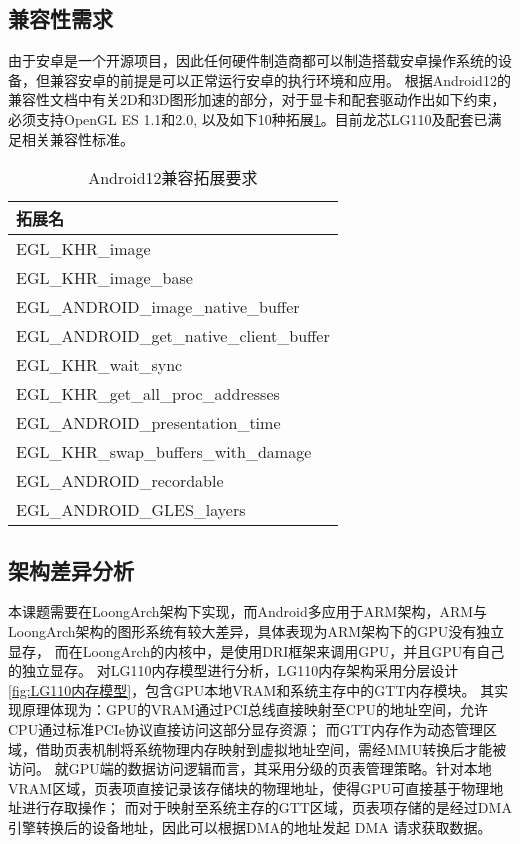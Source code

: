 \subsection{兼容性需求}
由于安卓是一个开源项目，因此任何硬件制造商都可以制造搭载安卓操作系统的设备，但兼容安卓的前提是可以正常运行安卓的执行环境和应用。
根据Android12的兼容性文档\cite{Android-12-cdd}中有关2D和3D图形加速的部分，对于显卡和配套驱动作出如下约束，必须支持OpenGL ES 1.1和2.0,
以及如下10种拓展\ref{tab:Android12兼容拓展要求}。目前龙芯LG110及配套已满足相关兼容性标准。

\begin{table}[h]
  \centering
  \caption{Android12兼容拓展要求}
  \label{tab:Android12兼容拓展要求}
  \begin{tabular}{l}
    \toprule
    拓展名  \\
    \midrule
    EGL\_KHR\_image \\
    EGL\_KHR\_image\_base \\
    EGL\_ANDROID\_image\_native\_buffer \\
    EGL\_ANDROID\_get\_native\_client\_buffer \\
    EGL\_KHR\_wait\_sync \\
    EGL\_KHR\_get\_all\_proc\_addresses \\
    EGL\_ANDROID\_presentation\_time \\
    EGL\_KHR\_swap\_buffers\_with\_damage \\
    EGL\_ANDROID\_recordable \\
    EGL\_ANDROID\_GLES\_layers \\
    \bottomrule
  \end{tabular}
  \note{}
\end{table}

\subsection{架构差异分析}
\label{sec:架构差异分析}
本课题需要在LoongArch架构下实现，而Android多应用于ARM架构，ARM与LoongArch架构的图形系统有较大差异，具体表现为ARM架构下的GPU没有独立显存\cite{Inki}，
而在LoongArch的内核中，是使用DRI框架来调用GPU，并且GPU有自己的独立显存。
对LG110内存模型进行分析，LG110内存架构采用分层设计\ref{fig:LG110内存模型}，包含GPU本地VRAM和系统主存中的GTT内存模块。
其实现原理体现为：GPU的VRAM通过PCI总线直接映射至CPU的地址空间，允许CPU通过标准PCIe协议直接访问这部分显存资源；
而GTT内存作为动态管理区域，借助页表机制将系统物理内存映射到虚拟地址空间，需经MMU转换后才能被访问。
就GPU端的数据访问逻辑而言，其采用分级的页表管理策略。针对本地VRAM区域，页表项直接记录该存储块的物理地址，使得GPU可直接基于物理地址进行存取操作；
而对于映射至系统主存的GTT区域，页表项存储的是经过DMA引擎转换后的设备地址，因此可以根据DMA的地址发起 DMA 请求获取数据。


